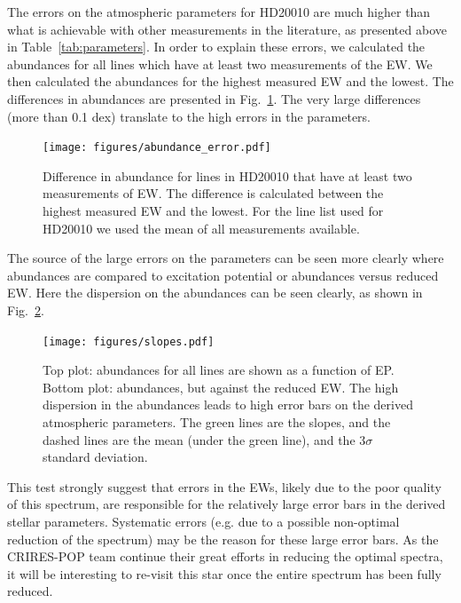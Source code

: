 \documentclass{aa}
\begin{document}
The errors on the atmospheric parameters for HD20010 are much
higher than what is achievable with other measurements in the
literature, as presented above in Table~\ref{tab:parameters}. In order
to explain these errors, we calculated the abundances for all lines
which have at least two measurements of the EW. We then calculated the
abundances for the highest measured EW and the lowest. The differences
in abundances are presented in Fig.~\ref{fig:abundance_error}. The very
large differences (more than 0.1 dex) translate to the high errors in
the parameters.

\begin{figure}[tpb!]
    \centering
    \texttt{[image: figures/abundance\_error.pdf]}
    \caption{Difference in abundance for lines in HD20010 that
    have at least two measurements of EW. The difference is calculated
    between the highest measured EW and the lowest. For the line list
    used for HD20010 we used the mean of all measurements available.}
    \label{fig:abundance_error}
\end{figure}

The source of the large errors on the parameters can be seen more
clearly where abundances are compared to excitation potential or
abundances versus reduced EW. Here the dispersion on the abundances can
be seen clearly, as shown in Fig.~\ref{fig:slopes}.

\begin{figure}[tpb!]
    \centering
    \texttt{[image: figures/slopes.pdf]}
    \caption{Top plot:   abundances for all
    lines are shown as a function of EP. Bottom plot:  abundances, but against the reduced EW. The high
    dispersion in the abundances leads to high error bars on the derived
    atmospheric parameters. The green lines are the slopes, and the
    dashed lines are the mean (under the green line), and the $3 \sigma$
    standard deviation.}
    \label{fig:slopes}
\end{figure}

This test strongly suggest that errors in the EWs, likely due to the
poor quality of this spectrum, are responsible for the relatively large
error bars in the derived stellar parameters. Systematic errors (e.g.
due to a possible non-optimal reduction of the spectrum) may be the
reason for these large error bars. As the CRIRES-POP team continue their
great efforts in reducing the optimal spectra, it will be interesting to
re-visit this star once the entire spectrum has been fully reduced.
\end{document}
